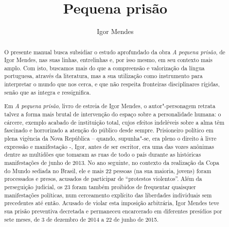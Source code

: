 \documentclass[11pt]{extarticle}
\begin{document}
\newcommand{\AutorLivro}{Igor Mendes}
\newcommand{\TituloLivro}{Pequena prisão}
\newcommand{\Tema}{Protagonismo juvenil}
\newcommand{\Genero}{Diário; biografia; autobiografia; relatos; memórias}
\newcommand{\imagemCapa}{./images/PNLD0062-MP-C.png}
\newcommand{\issnppub}{---}
\newcommand{\issnepub}{---}
\newcommand{\colaborador}{{Rebeca Martins de Souza}}


\title{\TituloLivro}
\author{\AutorLivro}
\def\authornotes{\colaborador}

\date{}
\maketitle


\begin{abstract}

O presente manual busca subsidiar o estudo aprofundado da obra \emph{A
pequena prisão}, de Igor Mendes, nas suas linhas, entrelinhas e, por
isso mesmo, em seu contexto mais amplo. Com isto, buscamos mais do que a
compreensão e valorização da língua portuguesa, através da literatura,
mas a sua utilização como instrumento para interpretar o mundo que nos
cerca, e que não respeita fronteiras disciplinares rígidas, senão que as
integra e ressignifica.

Em \emph{A pequena prisão}, livro de estreia de Igor Mendes, o
autor"-personagem retrata talvez a forma mais brutal de intervenção do
espaço sobre a personalidade humana: o cárcere, exemplo acabado de
instituição total, cujos efeitos indeléveis sobre a alma têm fascinado e
horrorizado a atenção do público desde sempre. Prisioneiro político em
plena vigência da Nova República -- quando, supunha"-se, era pleno o
direito à livre expressão e manifestação -, Igor, antes de ser escritor,
era uma das vozes anônimas dentre as multidões que tomaram as ruas de
todo o país durante as históricas manifestações de junho de 2013. No ano
seguinte, no contexto da realização da Copa do Mundo sediada no Brasil,
ele e mais 22 pessoas (na sua maioria, jovens) foram processados e
presos, acusados de participar de ``protestos violentos''. Além da
perseguição judicial, os 23 foram também proibidos de frequentar
quaisquer manifestações políticas, num cerceamento explícito das
liberdades individuais sem precedentes até então. Acusado de violar esta
imposição arbitrária, Igor Mendes teve sua prisão preventiva decretada e
permaneceu encarcerado em diferentes presídios por sete meses, de 3 de
dezembro de 2014 a 22 de junho de 2015.


\end{abstract}
\end{document}
